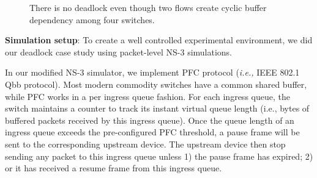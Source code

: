 \begin{figure}[t]
\caption{There is no deadlock even though two flows create cyclic buffer dependency among four switches.}
\label{fig:case1}
\end{figure}

 \textbf{Simulation setup}: To create a well controlled experimental environment, 
 we did our deadlock case study using packet-level NS-3 simulations. 
 
 In our modified NS-3 simulator, we implement PFC protocol ({\em i.e.,} IEEE 802.1 Qbb protocol). 
 Most modern commodity switches have a common shared buffer, while PFC works in a per ingress 
 queue fashion. For each ingress queue, the switch maintains a counter to 
 track its instant virtual queue length (i.e., bytes of buffered packets received by this 
 ingress queue). Once the queue length of an ingress queue exceeds the pre-configured PFC 
 threshold, a pause frame will be sent to the corresponding upstream device. The upstream 
 device then stop sending any packet to this ingress queue unless 1) the pause frame has 
 expired; 2) or it has received a resume frame from this ingress queue.
 

